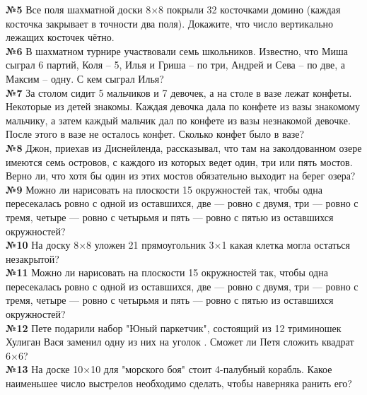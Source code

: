 \documentclass[12 pt, a4paper]{article}%
\newcommand{\task}[1]{{{\vspace{0.6cm} \vspace{-2ex} \textbf{№{#1}}  }}}
\begin{document}
	
	\task{5} Все поля шахматной доски 8×8 покрыли 32 косточками домино (каждая косточка закрывает в точности два поля).
	Докажите, что число вертикально лежащих косточек чётно.\\
	\task{6}В шахматном турнире участвовали семь школьников. Известно, что
	Миша сыграл 6 партий, Коля – 5, Илья и Гриша – по три, Андрей и Сева – по
	две, а Максим – одну. С кем сыграл Илья?\\
	\task{7}За столом сидит 5 мальчиков и 7 девочек, а на столе в вазе лежат   конфеты. Некоторые из детей знакомы. Каждая девочка дала по конфете из вазы знакомому мальчику, а затем каждый мальчик дал по конфете из вазы незнакомой девочке. После этого в вазе не осталось конфет. Сколько конфет было в вазе?\\
	\task{8}Джон, приехав из Диснейленда, рассказывал, что там на заколдованном озере имеются семь островов, с каждого из которых ведет один, три или пять мостов. Верно ли, что хотя бы один из этих мостов обязательно выходит на берег озера?\\
	\task{9}Можно ли нарисовать на плоскости 15 окружностей так, чтобы одна пересекалась ровно с одной из оставшихся,
	две — ровно с двумя, три — ровно с тремя, четыре — ровно с четырьмя и пять — ровно с пятью из оставшихся окружностей?\\
	\task{10} На доску 8×8 уложен 21 прямоугольник  3×1 какая клетка могла остаться незакрытой?\\
	\task{11} Можно ли нарисовать на плоскости 15 окружностей так, чтобы одна пересекалась ровно с одной из оставшихся,
	две — ровно с двумя, три — ровно с тремя, четыре — ровно с четырьмя и пять — ровно с пятью из оставшихся окружностей?\\
	\task{12}Пете подарили набор "Юный паркетчик", состоящий из 12 триминошек
	Хулиган Вася заменил одну из них на уголок
	. Сможет ли Петя сложить квадрат
	6×6?\\
	\task{13} На доске 10×10 для "морского боя" стоит 4-палубный корабль. Какое наименьшее
	число выстрелов необходимо сделать, чтобы наверняка ранить его?\\
\end{document}
